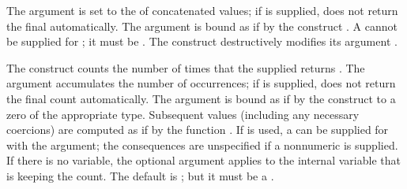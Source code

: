 The argument  is 
set to the  of 
concatenated values; if  is supplied, 
does not return the final  automatically.  
The  argument
is bound as if by the construct .
 A  cannot be supplied for ; 
it must be .
 The construct  
destructively modifies its argument .

The  construct counts the number of times 
that the supplied  returns .
The argument  accumulates the number of occurrences; 
if  is supplied, 
 does not return the final count automatically.
The  argument is bound as if by the construct  
to a zero of the appropriate type.
Subsequent values (including any necessary coercions) 
are computed as if by the function .
If   is used,
a  can be supplied  for  with the  argument;
the consequences are unspecified if a nonnumeric  is supplied.           
If there is no  variable,
the optional  argument
applies to the internal variable that is keeping the count.  
The default  is ; 
but it must be
a .
 
